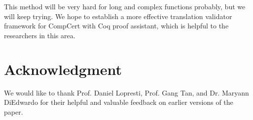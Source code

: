\documentclass[10pt, conference, compsocconf]{IEEEtran}
\begin{document}
This method will be very hard for long and complex functions probably, but we will keep trying. We hope to establish a more effective translation validator framework for CompCert with Coq proof assistant, which is helpful to the researchers in this area. 





\section*{Acknowledgment}

We would like to thank Prof. Daniel Lopresti, Prof. Gang Tan, and Dr. Maryann DiEdwardo for their helpful and valuable feedback on earlier versions of the paper.



\end{document}
